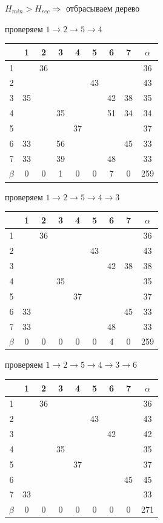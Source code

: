 \documentclass[russian]{article}
\begin{document}
$H_{min} > H_{rec} \Rightarrow $ отбрасываем дерево

проверяем 
$1 \to 2 \to 5 \to 4$

\begin{tabular}{|c|c|c|c|c|c|c|c|c|}\hline
& 1& 2& 3& 4& 5& 6& 7& $\alpha$\\\hline
1& & 36& & & & & & 36\\\hline
2& & & & & 43& & & 43\\\hline
3& 35& & & & & 42& 38& 35\\\hline
4& & & 35& & & 51& 34& 34\\\hline
5& & & & 37& & & & 37\\\hline
6& 33& & 56& & & & 45& 33\\\hline
7& 33& & 39& & & 48& & 33\\\hline
$\beta$& 0& 0& 1& 0& 0& 7& 0& 259\\\hline
\end{tabular}

проверяем 
$1 \to 2 \to 5 \to 4 \to 3$

\begin{tabular}{|c|c|c|c|c|c|c|c|c|}\hline
& 1& 2& 3& 4& 5& 6& 7& $\alpha$\\\hline
1& & 36& & & & & & 36\\\hline
2& & & & & 43& & & 43\\\hline
3& & & & & & 42& 38& 38\\\hline
4& & & 35& & & & & 35\\\hline
5& & & & 37& & & & 37\\\hline
6& 33& & & & & & 45& 33\\\hline
7& 33& & & & & 48& & 33\\\hline
$\beta$& 0& 0& 0& 0& 0& 4& 0& 259\\\hline
\end{tabular}

проверяем 
$1 \to 2 \to 5 \to 4 \to 3 \to 6$

\begin{tabular}{|c|c|c|c|c|c|c|c|c|}\hline
& 1& 2& 3& 4& 5& 6& 7& $\alpha$\\\hline
1& & 36& & & & & & 36\\\hline
2& & & & & 43& & & 43\\\hline
3& & & & & & 42& & 42\\\hline
4& & & 35& & & & & 35\\\hline
5& & & & 37& & & & 37\\\hline
6& & & & & & & 45& 45\\\hline
7& 33& & & & & & & 33\\\hline
$\beta$& 0& 0& 0& 0& 0& 0& 0& 271\\\hline
\end{tabular}
\end{document}
